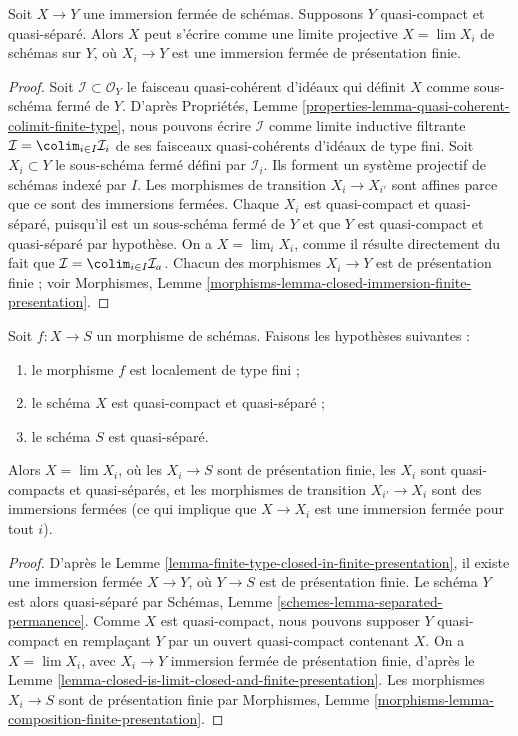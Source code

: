 \begin{lemma}
\label{lemma-closed-is-limit-closed-and-finite-presentation}
Soit $X \to Y$ une immersion fermée de schémas. Supposons $Y$ quasi-compact
et quasi-séparé. Alors $X$ peut s'écrire comme une limite projective
$X = \lim X_i$ de schémas sur $Y$, où $X_i \to Y$ est une immersion fermée
de présentation finie.
\end{lemma}

\begin{proof}
Soit $\mathcal{I} \subset \mathcal{O}_Y$ le faisceau quasi-cohérent d'idéaux
qui définit $X$ comme sous-schéma fermé de $Y$. D'après Propriétés,
Lemme \ref{properties-lemma-quasi-coherent-colimit-finite-type}, nous pouvons
écrire $\mathcal{I}$ comme limite inductive filtrante
$\mathcal{I} = \colim_{i \in I} \mathcal{I}_i$ de ses faisceaux
quasi-cohérents d'idéaux de type fini. Soit $X_i \subset Y$ le sous-schéma
fermé défini par $\mathcal{I}_i$. Ils forment un système projectif de schémas
indexé par $I$. Les morphismes de transition $X_i \to X_{i'}$ sont affines
parce que ce sont des immersions fermées. Chaque $X_i$ est quasi-compact et
quasi-séparé, puisqu'il est un sous-schéma fermé de $Y$ et que $Y$ est
quasi-compact et quasi-séparé par hypothèse. On a $X = \lim_i X_i$, comme il
résulte directement du fait que
$\mathcal{I} = \colim_{i \in I} \mathcal{I}_a$. Chacun des morphismes
$X_i \to Y$ est de présentation finie ; voir Morphismes,
Lemme \ref{morphisms-lemma-closed-immersion-finite-presentation}.
\end{proof}

\begin{lemma}
\label{lemma-finite-type-is-limit-finite-presentation}
Soit $f : X \to S$ un morphisme de schémas. Faisons les hypothèses suivantes :
\begin{enumerate}
\item le morphisme $f$ est localement de type fini ;
\item le schéma $X$ est quasi-compact et quasi-séparé ;
\item le schéma $S$ est quasi-séparé.
\end{enumerate}
Alors $X = \lim X_i$, où les $X_i \to S$ sont de présentation finie, les
$X_i$ sont quasi-compacts et quasi-séparés, et les morphismes de transition
$X_{i'} \to X_i$ sont des immersions fermées (ce qui implique que
$X \to X_i$ est une immersion fermée pour tout $i$).
\end{lemma}

\begin{proof}
D'après le Lemme \ref{lemma-finite-type-closed-in-finite-presentation}, il
existe une immersion fermée $X \to Y$, où $Y \to S$ est de présentation
finie. Le schéma $Y$ est alors quasi-séparé par Schémas,
Lemme \ref{schemes-lemma-separated-permanence}. Comme $X$ est quasi-compact,
nous pouvons supposer $Y$ quasi-compact en remplaçant $Y$ par un ouvert
quasi-compact contenant $X$. On a $X = \lim X_i$, avec
$X_i \to Y$ immersion fermée de présentation finie, d'après le
Lemme \ref{lemma-closed-is-limit-closed-and-finite-presentation}.
Les morphismes $X_i \to S$ sont de présentation finie par Morphismes,
Lemme \ref{morphisms-lemma-composition-finite-presentation}.
\end{proof}

